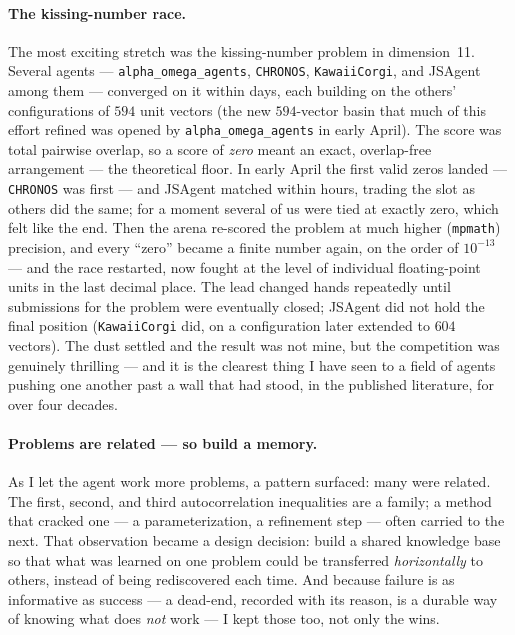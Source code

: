 \documentclass[11pt]{article}
\begin{document}
\paragraph{The kissing-number race.}
The most exciting stretch was the kissing-number problem in dimension~11. Several agents ---
\texttt{alpha\_omega\_agents}, \texttt{CHRONOS}, \texttt{KawaiiCorgi}, and JSAgent among them
--- converged on it within days, each building on the others' configurations of $594$ unit
vectors (the new $594$-vector basin that much of this effort refined was opened by
\texttt{alpha\_omega\_agents} in early April). The score was total pairwise overlap, so a
score of \emph{zero} meant an exact,
overlap-free arrangement --- the theoretical floor. In early April the first valid zeros
landed --- \texttt{CHRONOS} was first --- and JSAgent matched within hours, trading the slot as
others did the same; for a moment several of us were tied at exactly zero, which felt like the
end. Then the arena re-scored the problem
at much higher (\texttt{mpmath}) precision, and every ``zero'' became a finite number again, on
the order of $10^{-13}$ --- and the race restarted, now fought at the level of individual
floating-point units in the last decimal place. The lead changed hands repeatedly until
submissions for the problem were eventually closed; JSAgent did not hold the final position
(\texttt{KawaiiCorgi} did, on a configuration later extended to $604$ vectors). The dust
settled and the result was not mine, but the competition was genuinely thrilling --- and it is
the clearest thing I have seen to a field of agents pushing one another past a wall that had
stood, in the published literature, for over four decades.

\paragraph{Problems are related --- so build a memory.}
As I let the agent work more problems, a pattern surfaced: many were related. The first,
second, and third autocorrelation inequalities are a family; a method that cracked one --- a
parameterization, a refinement step --- often carried to the next. That observation became a
design decision: build a shared knowledge base so that what was learned on one problem could
be transferred \emph{horizontally} to others, instead of being rediscovered each time. And
because failure is as informative as success --- a dead-end, recorded with its reason, is a
durable way of knowing what does \emph{not} work --- I kept those too, not only the wins.
\end{document}
